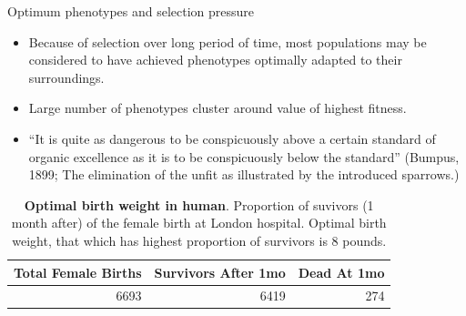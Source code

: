 \documentclass[11pt,dvipsnames,ignorenonframetext,aspectratio=169]{beamer}
\providecommand{\tightlist}{%
  \setlength{\itemsep}{0pt}\setlength{\parskip}{0pt}}
\begin{document}
\begin{frame}{Optimum phenotypes and selection pressure}
\protect\hypertarget{optimum-phenotypes-and-selection-pressure}{}
\begin{itemize}
\tightlist
\item
  Because of selection over long period of time, most populations may be
  considered to have achieved phenotypes optimally adapted to their
  surroundings.
\item
  Large number of phenotypes cluster around value of highest fitness.
\item
  ``It is quite as dangerous to be conspicuously above a certain
  standard of organic excellence as it is to be conspicuously below the
  standard'' (Bumpus, 1899; The elimination of the unfit as illustrated
  by the introduced sparrows.)
\end{itemize}

\begin{table}

\caption{\label{tab:optimal-birth-weight-human}\textbf{Optimal birth weight in human}. Proportion of suvivors (1 month after) of the female birth at London hospital. Optimal birth weight, that which has highest proportion of survivors is 8 pounds.}
\centering
\fontsize{8}{10}\selectfont
\begin{tabular}[t]{rrr}
\toprule
Total Female Births & Survivors After 1mo & Dead At 1mo\\
\midrule
6693 & 6419 & 274\\
\bottomrule
\end{tabular}
\end{table}
\end{frame}
\end{document}
